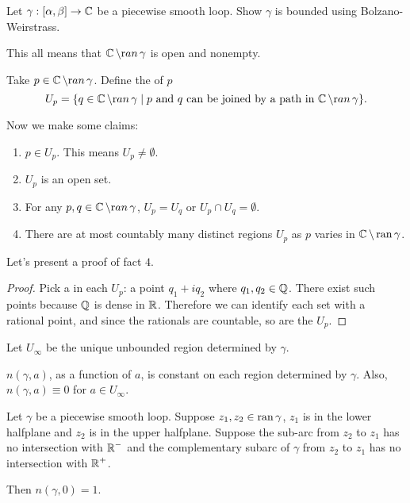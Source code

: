 \documentclass[notes]{subfile}
\begin{document}
\begin{exercise}
    Let $\gamma : [\alpha, \beta] \to \operatorname{\mathbb{C}}$ be a piecewise smooth loop.  Show $\gamma$ is bounded using Bolzano-Weirstrass.
\end{exercise}

\smallbreak
This all means that $\operatorname{\mathbb{C}} \setminus {\text ran} \, \gamma$ is open and nonempty.

\begin{definition}
    Take $p \in \operatorname{\mathbb{C}} \setminus {\text ran} \, \gamma$.
    Define the  of $p$
    \[ U_p = \{ q \in \operatorname{\mathbb{C}} \setminus {\text ran} \, \gamma \; | \; 
    \text{$p$ and $q$ can be joined by a path in $\operatorname{\mathbb{C}} \setminus {\text ran} \, \gamma$} \}. \]
\end{definition}
Now we make some claims:

\begin{enumerate}
    \item $p \in  U_p$.  This means $U_p \ne \emptyset$.

    \item $U_p$ is an open set.

    \item For any $p,q \in \operatorname{\mathbb{C}} \setminus {\text ran} \, \gamma$, $U_p = U_q$ or $U_p \cap U_q = \emptyset$.

    \item There are at most countably many distinct regions $U_p$ as $p$ varies in $\operatorname{\mathbb{C}} \setminus \operatorname{ran}{\gamma}$.
\end{enumerate}

Let's present a proof of fact $4$.

\begin{proof}
    Pick a  in each $U_p$: a point $q_1 + iq_2$ where $q_1, q_2 \in \operatorname{\mathbb{Q}}$.
    There exist such points because $\operatorname{\mathbb{Q}}$ is dense in $\operatorname{\mathbb{R}}$.
    Therefore we can identify each set with a rational point, and since the rationals are countable, so are the $U_p$.
\end{proof}

Let $U_{\infty}$ be the unique unbounded region determined by $\gamma$.

\begin{theorem}
    $n(\gamma, a)$, as a function of $a$, is constant on each region determined by $\gamma$.
    Also, $n(\gamma, a) \equiv 0$ for $a \in U_{\infty}$. 
\end{theorem}

\begin{theorem}
    Let $\gamma$ be a piecewise smooth loop.
    Suppose $z_1, z_2 \in \operatorname{ran}{\gamma}$, $z_1$ is in the lower halfplane and $z_2$ is in the upper halfplane.
    Suppose the sub-arc from $z_2$ to $z_1$ has no intersection with $\operatorname{\mathbb{R}}^-$ and the complementary subarc of $\gamma$ from $z_2$ to $z_1$ has no intersection with $\operatorname{\mathbb{R}}^+$.

    \noindent
    Then $n(\gamma, 0) = 1$.
\end{theorem}
\end{document}

